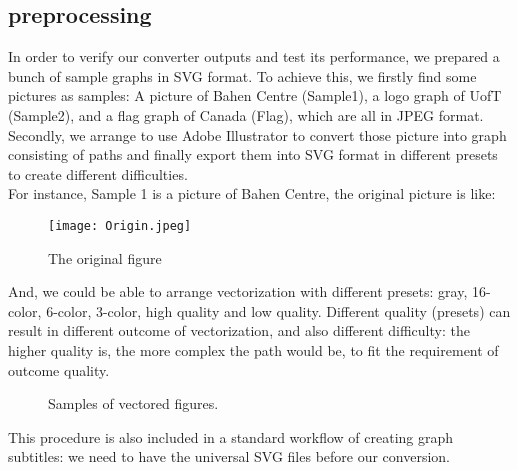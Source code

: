 \documentclass[10pt,twocolumn,letterpaper]{article}
\numberwithin{figure}{section}
\begin{document}
\subsection{preprocessing}

In order to verify our converter outputs and test its performance, we prepared a bunch of sample graphs in SVG format. To achieve this, we firstly find some pictures as samples: A picture of Bahen Centre (Sample1), a logo graph of UofT (Sample2), and a flag graph of Canada (Flag), which are all in JPEG format. Secondly, we arrange to use Adobe Illustrator to convert those picture into graph consisting of paths and finally export them into SVG format in different presets to create different difficulties.\\

For instance, Sample 1 is a picture of Bahen Centre, the original picture is like:

\begin{figure}[h]
    \centering
    \texttt{[image: Origin.jpeg]}
    \caption{The original figure}
    \label{fig:my_label}
\end{figure}

And, we could be able to arrange vectorization with different presets: gray, 16-color, 6-color, 3-color, high quality and low quality. Different quality (presets) can result in different outcome of vectorization, and also different difficulty: the higher quality is, the more complex the path would be, to fit the requirement of outcome quality. %


\begin{figure}[ht]  
\begin{center} 
        \caption{Samples of vectored figures.}  
\end{center}  
\end{figure}

This procedure is also included in a standard workflow of creating graph subtitles: we need to have the universal SVG files before our conversion.
\end{document}
